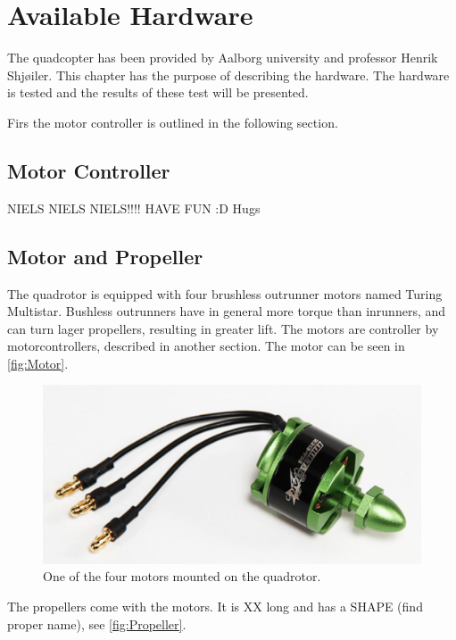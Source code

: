 \section{Available Hardware}
The quadcopter has been provided by Aalborg university and professor Henrik Shjøiler. This chapter has the purpose of describing the hardware. 
The hardware is tested and the results of these test will be presented. 

Firs the motor controller is outlined in the following section. 
\subsection{Motor Controller}
NIELS NIELS NIELS!!!! HAVE FUN :D Hugs

\subsection{Motor and Propeller}
The quadrotor is equipped with four brushless outrunner motors named Turing Multistar. Bushless outrunners have in general more torque than inrunners, and can turn lager propellers, resulting in greater lift. The motors are controller by motorcontrollers, described in another section.
The motor can be seen in \autoref{fig:Motor}.
\begin{figure}[H]
	\centering
	\includegraphics[scale=0.5]{figures/motor.png}
	\caption{One of the four motors mounted on the quadrotor.}
	\label{fig:Motor}
\end{figure} The propellers come with the motors. It is XX long and has a SHAPE (find proper name), see \autoref{fig:Propeller}.

